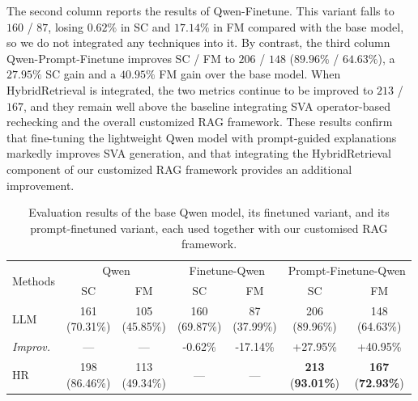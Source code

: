 The second column reports the results of Qwen-Finetune. This variant falls to $160$ / $87$, losing $0.62 \%$ in SC and $17.14 \%$ in FM compared with the base model, so we do not integrated any techniques into it. 
By contrast, the third column Qwen-Prompt-Finetune improves SC / FM to $206$ / $148$ ($89.96 \%$ / $64.63 \%$), a $27.95 \%$ SC gain and a $40.95 \%$ FM gain over the base model. 
When HybridRetrieval is integrated, the two metrics continue to be improved to $213$ / $167$, and they remain well above the baseline integrating SVA operator-based rechecking and the overall customized RAG framework. 
These results confirm that fine-tuning the lightweight Qwen model with prompt-guided explanations markedly improves SVA generation, and that integrating the HybridRetrieval component of our customized RAG framework provides an additional improvement.
\begin{table}[t]
\centering
\caption{Evaluation results of the base Qwen model, its finetuned variant, and its prompt-finetuned variant, each used together with our customised RAG framework.}
\label{tab:qwen_results}
\setlength{\tabcolsep}{1.5pt}
\renewcommand{\arraystretch}{1.35}
\begin{tabular}{@{}lcc cc cc@{}}
\toprule
\multirow{2}{*}{Methods} &
\multicolumn{2}{c}{Qwen} &
\multicolumn{2}{c}{Finetune-Qwen} &
\multicolumn{2}{c}{Prompt-Finetune-Qwen} \\ \cmidrule(lr){2-3}\cmidrule(lr){4-5}\cmidrule(l){6-7}
 & SC & FM & SC & FM & SC & FM \\ \midrule
LLM     & \tabincell{c}{161\\(70.31\%)} & \tabincell{c}{105\\(45.85\%)} & \tabincell{c}{160\\(69.87\%)} & \tabincell{c}{87\\(37.99\%)}  & \tabincell{c}{206\\(89.96\%)} & \tabincell{c}{148\\(64.63\%)} \\
\textit{Improv.} & --- & --- & -0.62\% & -17.14\% & +27.95\% & +40.95\% \\[1ex]
\hline
HR      & \tabincell{c}{198\\(86.46\%)} & \tabincell{c}{113\\(49.34\%)} & --- & --- & \tabincell{c}{\textbf{213}\\(\textbf{93.01\%})} & \tabincell{c}{\textbf{167}\\(\textbf{72.93\%})} \\

\end{tabular}
\end{table}
